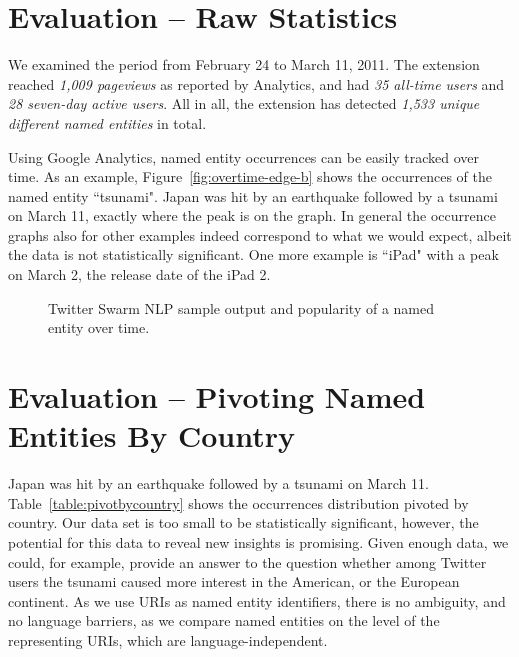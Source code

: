 \documentclass[runningheads,a4paper]{llncs}
\begin{document}
\section{Evaluation -- Raw Statistics}
We examined the period from February 24 to March 11, 2011. The extension reached \textit{1,009 pageviews} as reported by Analytics, and had \textit{35 all-time users} and \textit{28 seven-day active users}. All in all, the extension has detected \textit{1,533 unique different named entities} in total. 

Using Google Analytics, named entity occurrences can be easily tracked over time. As an example, Figure~\ref{fig:overtime-edge-b} shows the occurrences of the named entity ``tsunami". Japan was hit by an earthquake followed by a tsunami on March 11, exactly where the peak is on the graph. In general the occurrence graphs also for other examples indeed correspond to what we would expect, albeit the data is not statistically significant. One more example is ``iPad" with a peak on March 2, the release date of the iPad 2.

\begin{figure}[htb!]
  \begin{center}
  \end{center}
  \caption{Twitter Swarm NLP sample output and popularity of a named entity over time.}
  \label{fig:overtime}
\end{figure}

\section{Evaluation -- Pivoting Named Entities By Country}
Japan was hit by an earthquake followed by a tsunami on March 11. Table~\ref{table:pivotbycountry} shows the occurrences distribution pivoted by country. Our data set is too small to be statistically significant, however, the potential for this data to reveal new insights is promising. Given enough data, we could, for example, provide an answer to the question whether among Twitter users the tsunami caused more interest in the American, or the European continent. As we use URIs as named entity identifiers, there is no ambiguity, and no language barriers, as we compare named entities on the level of the representing URIs, which are language-independent.
\end{document}

